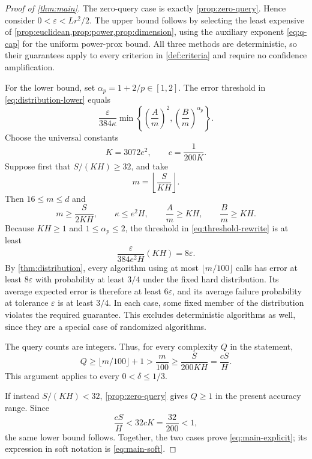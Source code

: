 \documentclass[11pt]{article}
\newcommand{\eps}{\varepsilon}
\theoremstyle{definition}
\theoremstyle{remark}
\begin{document}
\begin{proof}[Proof of \cref{thm:main}]
The zero-query case is exactly \cref{prop:zero-query}.
Hence consider $0<\eps<Lr^2/2$.
The upper bound follows by selecting the least expensive of
\cref{prop:euclidean,prop:power,prop:dimension}, using the auxiliary
exponent \cref{eq:q-cap} for the uniform power-prox bound.
All three methods are deterministic, so their guarantees apply to
every criterion in \cref{def:criteria} and require no confidence
amplification.

For the lower bound, set $\alpha_p=1+2/p\in[1,2]$.
The error threshold in \cref{eq:distribution-lower} equals
\begin{equation}
\label{eq:threshold-rewrite}
 \frac{\eps}{384\kappa}
 \min\left\{
  \left(\frac A m\right)^2,
  \left(\frac B m\right)^{\alpha_p}
 \right\}.
\end{equation}
Choose the universal constants
\[
 K=3072e^2,
 \qquad c=\frac1{200K}.
\]
Suppose first that $S/(KH)\ge32$, and take
\[
 m=\left\lfloor\frac{S}{KH}\right\rfloor.
\]
Then $16\le m\le d$ and
\[
 m\ge\frac{S}{2KH},\qquad
 \kappa\le e^2H,\qquad
 \frac A m\ge KH,\qquad\frac B m\ge KH.
\]
Because $KH\ge1$ and $1\le\alpha_p\le2$, the threshold in
\cref{eq:threshold-rewrite} is at least
\[
 \frac{\eps}{384e^2H}(KH)=8\eps.
\]
By \cref{thm:distribution}, every algorithm using at most
$\lfloor m/100\rfloor$ calls has error at least $8\eps$ with probability
at least $3/4$ under the fixed hard distribution.
Its average expected error is therefore at least $6\eps$, and its
average failure probability at tolerance $\eps$ is at least $3/4$.
In each case, some fixed member of the distribution violates the
required guarantee.  This excludes deterministic algorithms as well,
since they are a special case of randomized algorithms.

The query counts are integers.  Thus, for every complexity $Q$ in the
statement,
\[
 Q\ge\lfloor m/100\rfloor+1
   >\frac m{100}
   \ge\frac{S}{200KH}
   =\frac{cS}{H}.
\]
This argument applies to every $0<\delta\le1/3$.

If instead $S/(KH)<32$, \cref{prop:zero-query} gives $Q\ge1$ in the
present accuracy range.  Since
\[
 \frac{cS}{H}<32cK=\frac{32}{200}<1,
\]
the same lower bound follows.
Together, the two cases prove \cref{eq:main-explicit}; its expression in
soft notation is \cref{eq:main-soft}.
\end{proof}
\end{document}
